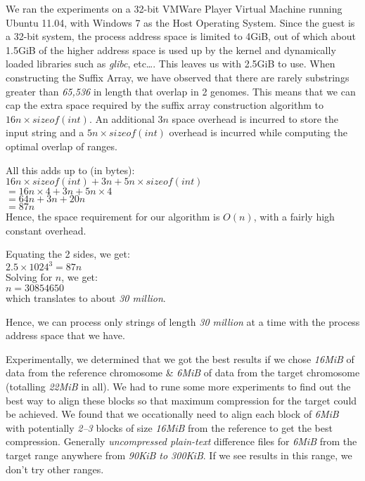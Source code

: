 \documentclass[11pt]{article}
\begin{document}
We ran the experiments on a 32-bit VMWare Player Virtual Machine
running Ubuntu 11.04, with Windows 7 as the Host Operating
System. Since the guest is a 32-bit system, the process address space
is limited to 4GiB, out of which about 1.5GiB of the higher address
space is used up by the kernel and dynamically loaded libraries such
as \textit{glibc}, etc\ldots{}. This leaves us with 2.5GiB to
use. When constructing the Suffix Array, we have observed that there
are rarely substrings greater than \textit{65,536} in length that
overlap in 2 genomes. This means that we can cap the extra space
required by the suffix array construction algorithm to $16n \times
sizeof(int)$. An additional $3n$ space overhead is incurred to store
the input string and a $5n \times sizeof(int)$ overhead is incurred
while computing the optimal overlap of ranges.

All this adds up to (in bytes):\\
$16n \times sizeof(int) + 3n + 5n \times sizeof(int)$\\
$= 16n \times 4 + 3n + 5n \times 4$\\
$= 64n + 3n + 20n$\\
$= 87n$\\

Hence, the space requirement for our algorithm is $O(n)$, with a
fairly high constant overhead.

Equating the 2 sides, we get:\\
$2.5 \times 1024^3 = 87n$\\
Solving for $n$, we get:\\
$n = 30854650$\\
which translates to about \textit{30 million}.

Hence, we can process only strings of length \textit{30 million} at a
time with the process address space that we have.

Experimentally, we determined that we got the best results if we chose
\textit{16MiB} of data from the reference chromosome \& \textit{6MiB}
of data from the target chromosome (totalling \textit{22MiB} in
all). We had to rune some more experiments to find out the best way to
align these blocks so that maximum compression for the target could be
achieved. We found that we occationally need to align each block of
\textit{6MiB} with potentially \textit{2--3} blocks of size
\textit{16MiB} from the reference to get the best
compression. Generally \textit{uncompressed plain-text} difference
files for \textit{6MiB} from the target range anywhere from
{\textit{90KiB to 300KiB}}. If we see results in this range, we don't
try other ranges.
\end{document}
